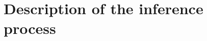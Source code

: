 \documentclass[a4paper,11pt]{article}
\begin{document}
{%



\section{Description of the inference process}


}
\end{document}
